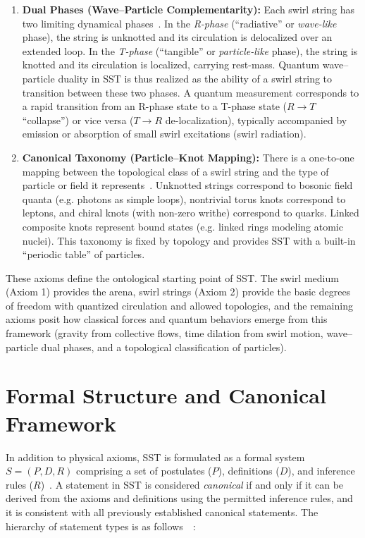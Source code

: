 \documentclass[aps,onecolumn,10pt,nofootinbib]{revtex4}
\begin{document}
\begin{enumerate}
	\item \textbf{Dual Phases (Wave–Particle Complementarity):} Each swirl string has two limiting dynamical phases~\cite{index24}. In the \emph{R-phase} (“radiative” or \emph{wave-like} phase), the string is unknotted and its circulation is delocalized over an extended loop. In the \emph{T-phase} (“tangible” or \emph{particle-like} phase), the string is knotted and its circulation is localized, carrying rest-mass. Quantum wave–particle duality in SST is thus realized as the ability of a swirl string to transition between these two phases. A quantum measurement corresponds to a rapid transition from an R-phase state to a T-phase state ($R\to T$ “collapse”) or vice versa ($T\to R$ de-localization), typically accompanied by emission or absorption of small swirl excitations (swirl radiation).
	\item \textbf{Canonical Taxonomy (Particle–Knot Mapping):} There is a one-to-one mapping between the topological class of a swirl string and the type of particle or field it represents~\cite{index25}. Unknotted strings correspond to bosonic field quanta (e.g. photons as simple loops), nontrivial torus knots correspond to leptons, and chiral knots (with non-zero writhe) correspond to quarks. Linked composite knots represent bound states (e.g. linked rings modeling atomic nuclei). This taxonomy is fixed by topology and provides SST with a built-in “periodic table” of particles.
	\end{enumerate}


	These axioms define the ontological starting point of SST. The swirl medium (Axiom 1) provides the arena, swirl strings (Axiom 2) provide the basic degrees of freedom with quantized circulation and allowed topologies, and the remaining axioms posit how classical forces and quantum behaviors emerge from this framework (gravity from collective flows, time dilation from swirl motion, wave–particle dual phases, and a topological classification of particles).

	\section{Formal Structure and Canonical Framework}
	In addition to physical axioms, SST is formulated as a formal system $S = (P, D, R)$ comprising a set of postulates ($P$), definitions ($D$), and inference rules ($R$)~\cite{index26}. A statement in SST is considered \emph{canonical} if and only if it can be derived from the axioms and definitions using the permitted inference rules, and it is consistent with all previously established canonical statements. The hierarchy of statement types is as follows~\cite{index27}~\cite{index28}:
\end{document}
